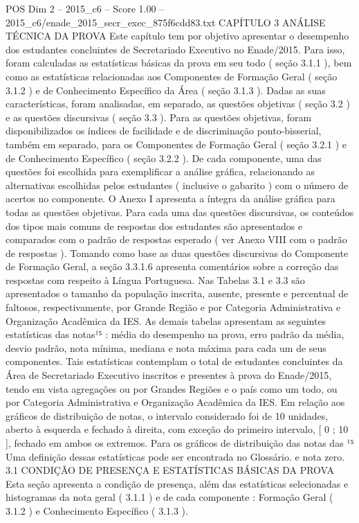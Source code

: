 \begin{textsample}{POS Dim 2 – 2015\_c6 – Score 1.00 – 2015\_c6/enade\_2015\_secr\_exec\_875f6cdd83.txt}  \label{ex:f2_pos_236}
CAPÍTULO 3 ANÁLISE TÉCNICA DA PROVA Este capítulo tem por objetivo apresentar o desempenho dos estudantes concluintes de Secretariado Executivo no Enade/2015.
Para isso, foram calculadas as estatísticas básicas da prova em seu todo ( seção 3.1.1 ), bem como as estatísticas relacionadas aos Componentes de Formação Geral ( seção 3.1.2 ) e de Conhecimento Específico da Área ( seção 3.1.3 ).
Dadas as suas características, foram analisadas, em separado, as questões objetivas ( seção 3.2 ) e as questões discursivas ( seção 3.3 ).
Para as questões objetivas, foram disponibilizados os índices de facilidade e de discriminação ponto-bisserial, também em separado, para os Componentes de Formação Geral ( seção 3.2.1 ) e de Conhecimento Específico ( seção 3.2.2 ).
De cada componente, uma das questões foi escolhida para exemplificar a análise gráfica, relacionando as alternativas escolhidas pelos estudantes ( inclusive o gabarito ) com o número de acertos no componente.
O Anexo I apresenta a íntegra da análise gráfica para todas as questões objetivas.
Para cada uma das questões discursivas, os conteúdos dos tipos mais comuns de respostas dos estudantes são apresentados e comparados com o padrão de respostas esperado ( ver Anexo VIII com o padrão de respostas ).
Tomando como base as duas questões discursivas do Componente de Formação Geral, a seção 3.3.1.6 apresenta comentários sobre a correção das respostas com respeito à Língua Portuguesa.
Nas Tabelas 3.1 e 3.3 são apresentados o tamanho da população inscrita, ausente, presente e percentual de faltosos, respectivamente, por Grande Região e por Categoria Administrativa e Organização Acadêmica da IES.
As demais tabelas apresentam as seguintes estatísticas das notas¹⁵ : média do desempenho na prova, erro padrão da média, desvio padrão, nota mínima, mediana e nota máxima para cada um de seus componentes.
Tais estatísticas contemplam o total de estudantes concluintes da Área de Secretariado Executivo inscritos e presentes à prova do Enade/2015, tendo em vista agregações ou por Grandes Regiões e o país como um todo, ou por Categoria Administrativa e Organização Acadêmica da IES.
Em relação aos gráficos de distribuição de notas, o intervalo considerado foi de 10 unidades, aberto à esquerda e fechado à direita, com exceção do primeiro intervalo, [ 0 ; 10 ], fechado em ambos os extremos.
Para os gráficos de distribuição das notas das ¹⁵ Uma definição dessas estatísticas pode ser encontrada no Glossário. e nota zero. 3.1 CONDIÇÃO DE PRESENÇA E ESTATÍSTICAS BÁSICAS DA PROVA Esta seção apresenta a condição de presença, além das estatísticas selecionadas e histogramas da nota geral ( 3.1.1 ) e de cada componente : Formação Geral ( 3.1.2 ) e Conhecimento Específico ( 3.1.3 ).

\end{textsample}
